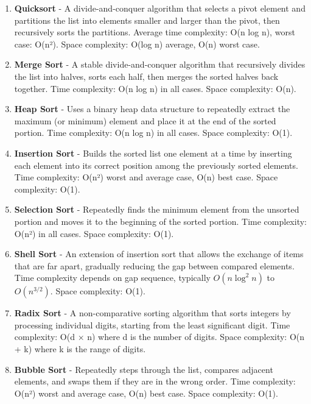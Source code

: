\documentclass[12pt]{article}
\begin{document}
\begin{enumerate}[start=1]
    \item \textbf{Quicksort} - A divide-and-conquer algorithm that selects a pivot element and partitions the list into elements smaller and larger than the pivot, then recursively sorts the partitions. Average time complexity: O(n log n), worst case: O(n²). Space complexity: O(log n) average, O(n) worst case.
    
    \item \textbf{Merge Sort} - A stable divide-and-conquer algorithm that recursively divides the list into halves, sorts each half, then merges the sorted halves back together. Time complexity: O(n log n) in all cases. Space complexity: O(n).
    
    \item \textbf{Heap Sort} - Uses a binary heap data structure to repeatedly extract the maximum (or minimum) element and place it at the end of the sorted portion. Time complexity: O(n log n) in all cases. Space complexity: O(1).
    
    \item \textbf{Insertion Sort} - Builds the sorted list one element at a time by inserting each element into its correct position among the previously sorted elements. Time complexity: O(n²) worst and average case, O(n) best case. Space complexity: O(1).
    
    \item \textbf{Selection Sort} - Repeatedly finds the minimum element from the unsorted portion and moves it to the beginning of the sorted portion. Time complexity: O(n²) in all cases. Space complexity: O(1).
    
    \item \textbf{Shell Sort} - An extension of insertion sort that allows the exchange of items that are far apart, gradually reducing the gap between compared elements. Time complexity depends on gap sequence, typically $O(n \log^2 n)$ to $O(n^{3/2})$. Space complexity: O(1).
    
    \item \textbf{Radix Sort} - A non-comparative sorting algorithm that sorts integers by processing individual digits, starting from the least significant digit. Time complexity: O(d × n) where d is the number of digits. Space complexity: O(n + k) where k is the range of digits.
    
    \item \textbf{Bubble Sort} - Repeatedly steps through the list, compares adjacent elements, and swaps them if they are in the wrong order. Time complexity: O(n²) worst and average case, O(n) best case. Space complexity: O(1).
    

\end{enumerate}
\end{document}
